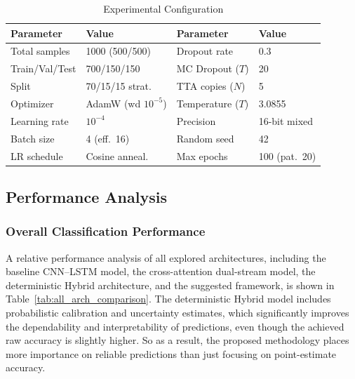 \documentclass[conference]{IEEEtran}
\begin{document}
\begin{table}[H]
\centering
\caption{Experimental Configuration}
\label{tab:exp_config}
\footnotesize
\setlength{\tabcolsep}{3pt}
\renewcommand{\arraystretch}{1.1}
\begin{tabular}{llll}
\hline
\textbf{Parameter} & \textbf{Value} & \textbf{Parameter} & \textbf{Value} \\
\hline
Total samples      & 1000 (500/500) & Dropout rate       & 0.3 \\
Train/Val/Test     & 700/150/150    & MC Dropout ($T$)   & 20 \\
Split              & 70/15/15 strat.& TTA copies ($N$)   & 5 \\
Optimizer          & AdamW (wd $10^{-5}$) & Temperature ($T$) & 3.0855 \\
Learning rate      & $10^{-4}$      & Precision          & 16-bit mixed \\
Batch size         & 4 (eff.\ 16)   & Random seed        & 42 \\
LR schedule        & Cosine anneal. & Max epochs         & 100 (pat.\ 20) \\
\hline
\end{tabular}
\end{table}

\subsection{Performance Analysis}

\subsubsection{Overall Classification Performance}

A relative performance analysis of all explored architectures, including the baseline CNN–LSTM model, the cross-attention dual-stream model, the deterministic Hybrid architecture, and the suggested framework, is shown in Table~\ref{tab:all_arch_comparison}.
The deterministic Hybrid model includes probabilistic calibration and uncertainty estimates, which significantly improves the dependability and interpretability of predictions, even though the achieved raw accuracy is slightly higher. So as a result, the proposed methodology places more importance on reliable predictions than just focusing on point-estimate accuracy.
\end{document}
